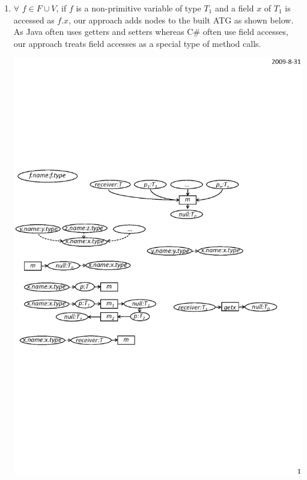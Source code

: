 \begin{enumerate}
\begin{center}
\end{center}\vspace*{-3ex}
\item $\forall$ $f\in F \cup V$, if $f$ is a non-primitive variable
of type $T_1$ and a field $x$ of $T_1$ is accessed as $f.x$, our
approach adds nodes to the built ATG as shown below. As Java often
uses getters and setters whereas C\# often use field accesses, our
approach treats field accesses as a special type of method
calls.\vspace*{-2ex}
\begin{center}
\includegraphics[scale=0.7,clip]{figure/rule3.eps}%
\end{center}\vspace*{-3ex}


\end{enumerate}

